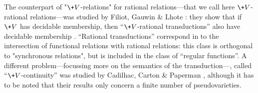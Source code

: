 The counterpart of "$\+V$-relations" for rational relations---that we call here $\+V$-rational relations---was studied by Filiot, Gauwin \& Lhote \cite{Filiot2019Logical}: they show that if
$\+V$ has decidable membership, then ``$\+V$-rational transductions'' also have decidable membership
\cite[Theorem 4.10, p.~26]{Filiot2019Logical}.
``Rational transductions'' correspond in  to the intersection of functional relations with rational relations: this class
is orthogonal to "synchronous relations",
but is included in the class of ``regular functions''.
A different problem---focussing more on the semantics of the transduction---, called ``$\+V$-continuity'' was studied by Cadilhac, Carton \& Paperman \cite[Theorem 1.3, p.~3]{Cadilhac2020Continuity}, although it has to be noted that their results only concern
a finite number of pseudovarieties.